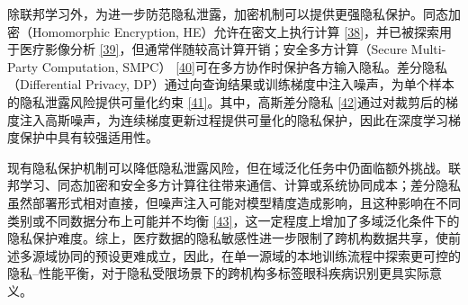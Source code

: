 除联邦学习外，为进一步防范隐私泄露，加密机制可以提供更强隐私保护。同态加密（Homomorphic Encryption, HE）允许在密文上执行计算 \hyperref[_Ref213950427]{{[}38{]}}，并已被探索用于医疗影像分析 \hyperref[_Ref213950433]{{[}39{]}}，但通常伴随较高计算开销；安全多方计算（Secure Multi-Party Computation, SMPC） \hyperref[_Ref213950438]{{[}40{]}}可在多方协作时保护各方输入隐私。差分隐私（Differential Privacy, DP）通过向查询结果或训练梯度中注入噪声，为单个样本的隐私泄露风险提供可量化约束 \hyperref[_Ref213950443]{{[}41{]}}。其中，高斯差分隐私 \hyperref[_Ref213950449]{{[}42{]}}通过对裁剪后的梯度注入高斯噪声，为连续梯度更新过程提供可量化的隐私保护，因此在深度学习梯度保护中具有较强适用性。

现有隐私保护机制可以降低隐私泄露风险，但在域泛化任务中仍面临额外挑战。联邦学习、同态加密和安全多方计算往往带来通信、计算或系统协同成本；差分隐私虽然部署形式相对直接，但噪声注入可能对模型精度造成影响，且这种影响在不同类别或不同数据分布上可能并不均衡 \hyperref[_Ref213950458]{{[}43{]}}，这一定程度上增加了多域泛化条件下的隐私保护难度。综上，医疗数据的隐私敏感性进一步限制了跨机构数据共享，使前述多源域协同的预设更难成立，因此，在单一源域的本地训练流程中探索更可控的隐私--性能平衡，对于隐私受限场景下的跨机构多标签眼科疾病识别更具实际意义。
